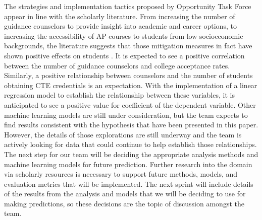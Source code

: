 The strategies and implementation tactics proposed by Opportunity Task Force appear in line with the scholarly literature. 
From increasing the number of guidance counselors to provide insight into academic and career options, to increasing the accessibility of AP courses to students from low socioeconomic backgrounds, the literature suggests that those mitigation measures in fact have shown positive effects on students \parencite[][]{castleman2014intensive}.
It is expected to see a positive correlation between the number of guidance counselors and college acceptance rates. 
Similarly, a positive relationship between counselors and the number of students obtaining CTE credentials is an expectation. 
With the implementation of a linear regression model to establish the relationship between these variables, it is anticipated to see a positive value for coefficient of the dependent variable. 
Other machine learning models are still under consideration, but the team expects to find results consistent with the hypothesis that have been presented in this paper. 
However, the details of those explorations are still underway and the team is actively looking for data that could continue to help establish those relationships. 
The next step for our team will be deciding the appropriate analysis methods and machine learning models for future prediction. 
Further research into the domain via scholarly resources is necessary to support future methods, models, and evaluation metrics that will be implemented.
The next sprint will include details of the results from the analysis and models that we will be deciding to use for making predictions, so these decisions are the topic of discussion amongst the team.